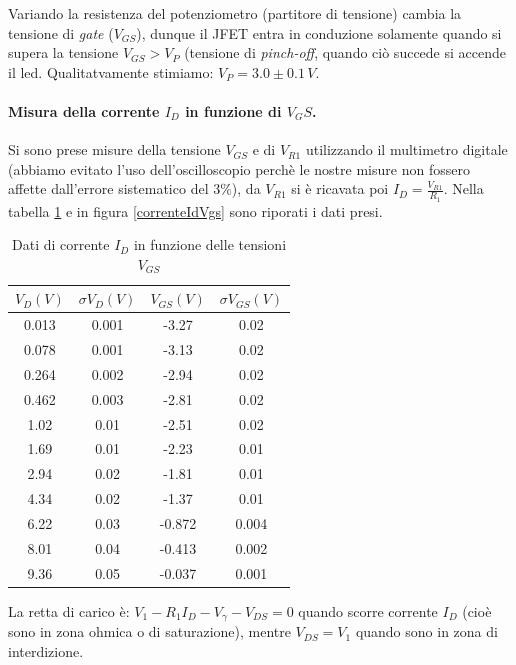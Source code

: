 \documentclass[10pt,a4paper]{article}
\begin{document}
Variando la resistenza del potenziometro (partitore di tensione) cambia la tensione di \emph{gate} ($V_{GS}$), dunque il JFET entra in conduzione solamente quando si supera la tensione $V_{GS} > V_{P}$ (tensione di \emph{pinch-off}, quando ciò succede si accende il led. Qualitatvamente stimiamo: $V_P = 3.0\pm0.1 \, V$.
\paragraph{Misura della corrente $I_D$ in funzione di $V_GS$.}
Si sono prese misure della tensione $V_{GS}$ e di $V_{R1}$ utilizzando il multimetro digitale (abbiamo evitato l'uso dell'oscilloscopio perchè le nostre misure non fossero affette dall'errore sistematico del $3\%$), da $V_{R1}$ si è ricavata poi $I_D = \frac{V_{R1}}{R_1}$. Nella tabella \ref{correnteId} e in figura \ref{correnteIdVgs} sono riporati i dati presi. \\

\begin{table}[!htb]\centering
\begin{tabular}{|c|c|c|c|}
\hline
$ V_D (V)$ & $ \sigma V_D (V) $ & $V_{GS} (V) $ & $\sigma V_{GS} (V)$\\ 
\hline
0.013 & 0.001 & -3.27 & 0.02\\
0.078 & 0.001 & -3.13 & 0.02\\
0.264 & 0.002 & -2.94 & 0.02\\
0.462 & 0.003 & -2.81 & 0.02\\
1.02 & 0.01 & -2.51 & 0.02\\
1.69 & 0.01 & -2.23 & 0.01\\
2.94 & 0.02 & -1.81 & 0.01\\
4.34 & 0.02 & -1.37 & 0.01\\
6.22 & 0.03 & -0.872 & 0.004\\
8.01 & 0.04 & -0.413 & 0.002\\
9.36 & 0.05 & -0.037 & 0.001\\
\hline
\end{tabular}
\caption{Dati di corrente $I_D$ in funzione delle tensioni $V_{GS}$}
\label{correnteId}
\end{table}

La retta di carico è: $V_1 - R_1 I_D-V_{\gamma}-V_{DS} = 0$ quando scorre corrente $I_D$ (cioè sono in zona ohmica o di saturazione), mentre $V_{DS} = V_1$ quando sono in zona di interdizione.\\
\end{document}
